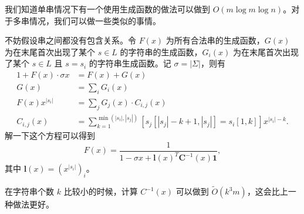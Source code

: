 \begin{solution}[做法三]
    我们知道单串情况下有一个使用生成函数的做法可以做到 $O(m\log m\log n)$。对于多串情况，我们可以做一些类似的事情。

    不妨假设串之间都没有包含关系。令 $F(x)$ 为所有合法串的生成函数，$G(x)$ 为在末尾首次出现了某个 $s\in L$ 的字符串的生成函数，$G_i(x)$ 为在末尾首次出现了某个 $s\in L$ 且 $s=s_i$ 的字符串生成函数。记 $\sigma=|\Sigma|$，则有
    $$
    \begin{aligned}
        1+F(x)\cdot \sigma x&=F(x)+G(x)\\
        G(x)&=\sum_i G_i(x)\\
        F(x)x^{|s_i|}&=\sum_j G_j(x)\cdot C_{i,j}(x)\\
        C_{i,j}(x)&=\sum_{k=1}^{\min(|s_i|,|s_j|)} [s_j[|s_j|-k+1,|s_j|]=s_i[1,k]]x^{|s_i|-k}.
    \end{aligned}
    $$
    解一下这个方程可以得到
    $$
    F(x)=\frac{1}{1-\sigma x+\mathbf l(x)^T\mathbf C^{-1}(x)\mathbf 1},
    $$
    其中 $\mathbf l(x)=(x^{|s_i|})_i$。

    在字符串个数 $k$ 比较小的时候，计算 $C^{-1}(x)$ 可以做到 $\tilde O(k^3m)$，这会比上一种做法更好。
    
\end{solution}

